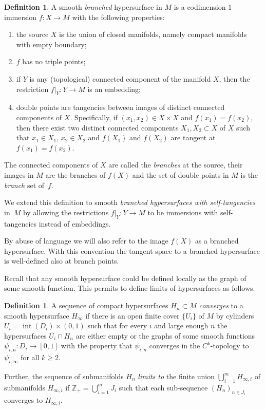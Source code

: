 \documentclass[JEP,XML,SOM,Unicode]{cedram}
\DeclareMathOperator{\inte}{int}
\theoremstyle{definition}
\newtheorem{definition}[theorem]{Definition}
\theoremstyle{remark}
\numberwithin{equation}{section}
\newcommand{\ZZ}{\mathbb Z}
\begin{document}
\begin{definition}
A smooth \emph{branched} hypersurface in $M$ is a codimension $1$ immersion
$f: X\to M$ with the following properties:
\begin{enumerate}
\item the source $X$ is the union of closed manifolds, namely compact manifolds with empty boundary;
\item $f$ has no triple points;
\item if $Y$ is any (topological) connected component of the manifold $X$, then the
restriction $f|_{Y}: Y\to M$ is an embedding;
\item double points are tangencies between images of distinct connected components of $X$.
Specifically, if
$(x_1,x_2)\in X\times X$ and $f(x_1)=f(x_2)$, then there exist two distinct connected components $X_1, X_2\subset X$
of $X$ such that $x_1\in X_1$, $x_2\in X_2$ and $f(X_1)$ and $f(X_2)$ are tangent at $f(x_1)=f(x_2)$.
\end{enumerate}
The connected components of $X$ are called the \emph{branches} at the source, their images in $M$ are the
branches of $f(X)$ and the set of double points in $M$ is the \emph{branch} set of~$f$.

We extend this definition to smooth \emph{branched hypersurfaces with self-tangencies} in~$M$
by allowing the restrictions $f|_{Y}: Y\to M$ to be immersions with self-tangencies instead of
embeddings.
\end{definition}

By abuse of language we will also refer to the image $f(X)$ as a branched hypersurface. With this convention
the tangent space to a branched hypersurface is well-defined also at branch points.

Recall that any smooth hypersurface could be defined locally as the graph of some smooth function.
This permits to define limits of hypersurfaces as follows.

\begin{definition}
A sequence of compact hypersurfaces $H_n\subset M$ \emph{converges} to a smooth hypersurface $H_{\infty}$ if there is an open finite cover $\{U_i\}$ of $M$ by cylinders
$U_i=\inte (D_i)\times (0,1)$ such that for every $i$ and large enough $n$ the hypersurfaces $\overline{U_i}\cap H_n$
are either empty or the graphs of some
smooth functions $\psi_{i,n}:D_i\to [0,1]$ with the property that $\psi_{i,n}$ converges in the $C^k$-topology to $\psi_{i,\infty}$
for all $k\geq 2$.

Further, the sequence of submanifolds $H_n$ \emph{limits to} the finite union $\bigcup_{i=1}^m H_{\infty,i}$ of submanifolds
$H_{\infty, i}$ if $\ZZ_+=\bigcup_{i=1}^mJ_i$ such that each
sub-sequence $(H_{n})_{n\in J_i}$ converges to $H_{\infty,i}$.
\end{definition}
\end{document}
